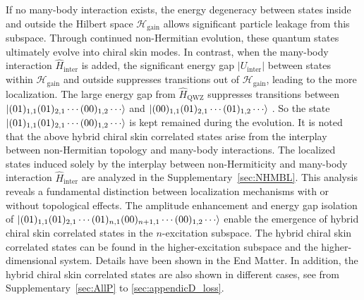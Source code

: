\documentclass[longbibliography, aps, prx, amsmath, amssymb, amsfonts, twocolumn,superscriptaddress, footinbib]{revtex4-1}
\begin{document}
    If no many-body interaction exists, the energy degeneracy between states inside and outside the Hilbert space $\mathscr{H}_{\text{gain}}$ allows significant particle leakage from this subspace.
	Through continued non-Hermitian evolution, these quantum states ultimately evolve into chiral skin modes.
	In contrast, when the many-body interaction $\hat{H}_{\text{inter}}$ is added, the significant energy gap $\vert U_{\text{inter}} \vert$ between states within $\mathscr{H}_{\text{gain}}$ and outside suppresses transitions out of $\mathscr{H}_{\text{gain}}$, leading to the more localization. 
	The large energy gap from $\hat{H}_{\text{QWZ}}$ suppresses transitions between $\ket{(01)_{1,1}(01)_{2,1}\cdots(00)_{1,2}\cdots}$ and $\ket{(00)_{1,1}(01)_{2,1}\cdots(01)_{1,2}\cdots}$ 
	. So the state $\ket{(01)_{1,1}(01)_{2,1}\cdots(00)_{1,2}\cdots}$ is kept remained during the evolution.
    It is noted that the above hybrid chiral skin correlated states arise from the interplay between non-Hermitian topology and many-body interactions. The localized states induced solely by the interplay between non-Hermiticity and many-body interaction $\hat{H}_{\text{inter}}$ are analyzed in the Supplementary~\ref{sec:NHMBL}.
	This analysis reveals a fundamental distinction between localization mechanisms with or without topological effects.
    The amplitude enhancement and energy gap isolation of $\ket{(01)_{1,1}(01)_{2,1}\cdots(01)_{n,1}(00)_{n+1,1}\cdots(00)_{1,2}\cdots}$ enable the emergence of hybrid chiral skin correlated states in the $n$-excitation subspace. 
	The hybrid chiral skin correlated states can be found in the higher-excitation subspace and the higher-dimensional system. Details have been shown in the End Matter.
    In addition, the hybrid chiral skin correlated states are also shown in different cases, see from Supplementary~\ref{sec:AllP} to \ref{sec:appendicD_loss}.
	
\end{document}
